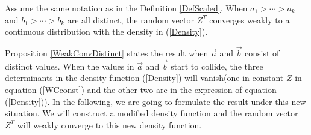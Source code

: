 \begin{proposition}{\label{WeakConvDistinct}}
Assume the same notation as in the Definition \ref{DefScaled}. When $a_{1}> \cdots > a_{k}$ and $b_{1}> \cdots > b_{k}$ are all distinct, the random vector $Z^{T}$ converges weakly to a continuous distribution with the density in (\ref{Density}).	
\end{proposition}

Proposition \ref{WeakConvDistinct} states the result when $\vec{a}$ and $\vec{b}$ consist of distinct values. When the values in $\vec{a}$ and $\vec{b}$ start to collide, the three determinants in the density function (\ref{Density}) will vanish(one in constant $Z$ in equation (\ref{WCconst}) and the other two are in the expression of equation (\ref{Density})). In the following, we are going to formulate the result under this new situation. We will construct a modified density function and the random vector $Z^{T}$ will weakly converge to this new density function.

